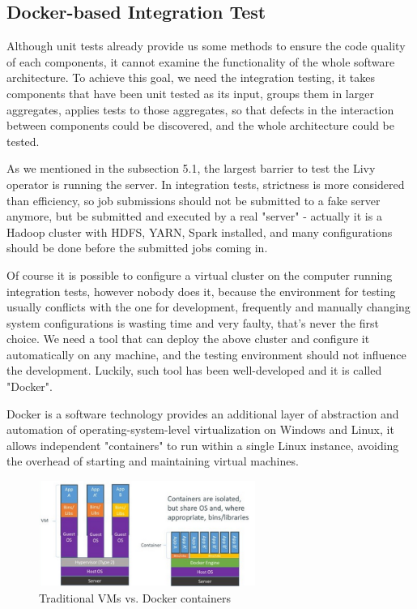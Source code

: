 \documentclass[article,colorback,accentcolor=tud4c]{tudreport}
\begin{document}
	\subsection{Docker-based Integration Test}
	Although unit tests already provide us some methods to ensure the code quality of each components, it cannot examine the functionality of the whole software architecture. To achieve this goal, we need the integration testing, it takes components that have been unit tested as its input, groups them in larger aggregates, applies tests to those aggregates, so that defects in the interaction between components could be discovered, and the whole architecture could be tested.
	
	As we mentioned in the subsection 5.1, the largest barrier to test the Livy operator is running the server. In integration tests, strictness is more considered than efficiency, so job submissions should not be submitted to a fake server anymore, but be submitted and executed by a real "server" - actually it is a Hadoop cluster with HDFS, YARN, Spark installed, and many configurations should be done before the submitted jobs coming in.
	
	Of course it is possible to configure a virtual cluster on the computer running integration tests, however nobody does it, because the environment for testing usually conflicts with the one for development, frequently and manually changing system configurations is wasting time and very faulty, that's never the first choice. We need a tool that can deploy the above cluster and configure it automatically on any machine, and the testing environment should not influence the development. Luckily, such tool has been well-developed and it is called "Docker".
	
	Docker is a software technology provides an additional layer of abstraction and automation of operating-system-level virtualization on Windows and Linux, it allows independent "containers" to run within a single Linux instance, avoiding the overhead of starting and maintaining virtual machines.
	
	
	\begin{figure}[!h]
		\centering
		\includegraphics[width=0.63\textwidth]{docker}
		\caption{Traditional VMs vs. Docker containers\cite{what is docker}}
	\end{figure}
\end{document}
